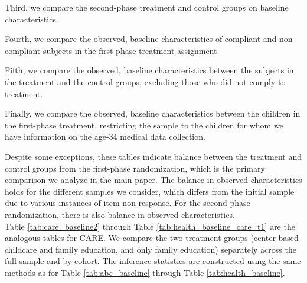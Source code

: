 \begin{appendices}


\noindent Third, we compare the second-phase treatment and control groups on baseline characteristics. 



\noindent Fourth, we compare the observed, baseline characteristics of compliant and non-compliant subjects in the first-phase treatment assignment.



\noindent Fifth, we compare the observed, baseline characteristics between the subjects in the treatment and the control groups, excluding those who did not comply to treatment.

\noindent Finally, we compare the observed, baseline characteristics between the children in the first-phase treatment, restricting the sample to the children for whom we have information on the age-34 medical data collection.



\noindent Despite some exceptions, these tables indicate balance between the treatment and control groups from the first-phase randomization, which is the primary comparison we analyze in the main paper. The balance in observed characteristics holds for the different samples we consider, which differs from the initial sample due to various instances of item non-response. For the second-phase randomization, there is also balance in observed characteristics. \\

\noindent Table \ref{tab:care_baseline2} through Table \ref{tab:health_baseline_care_t1} are the analogous tables for CARE. We compare the two treatment groups (center-based childcare and family education, and only family education) separately across the full sample and by cohort. The inference statistics are constructed using the same methods as for Table \ref{tab:abc_baseline} through Table \ref{tab:health_baseline}. \\


\end{appendices}
